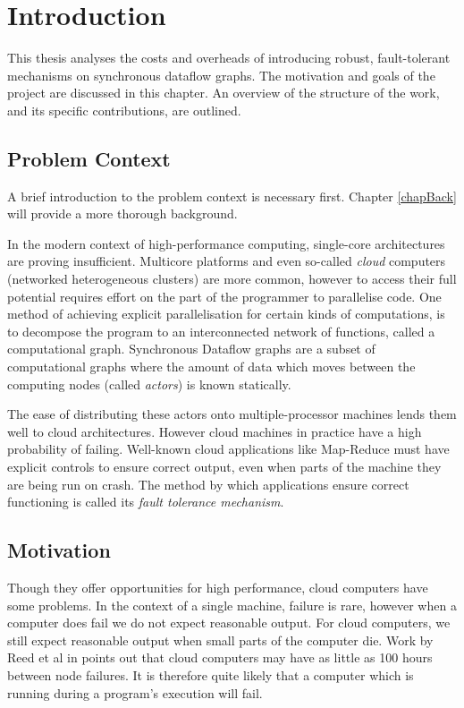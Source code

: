 \chapter{Introduction}

This thesis analyses the costs and overheads of introducing robust, fault-tolerant mechanisms on synchronous dataflow graphs.
The motivation and goals of the project are discussed in this chapter.
An overview of the structure of the work, and its specific contributions, are outlined.

\section{Problem Context}

A brief introduction to the problem context is necessary first.
Chapter \ref{chapBack} will provide a more thorough background.

In the modern context of high-performance computing, single-core architectures are proving insufficient.
Multicore platforms and even so-called {\em cloud} computers (networked heterogeneous clusters) are more common, however to access their full potential requires effort on the part of the programmer to parallelise code.
One method of achieving explicit parallelisation for certain kinds of computations, is to decompose the program to an interconnected network of functions, called a computational graph.
Synchronous Dataflow graphs are a subset of computational graphs where the amount of data which moves between the computing nodes (called {\em actors}) is known statically.

The ease of distributing these actors onto multiple-processor machines lends them well to cloud architectures.
However cloud machines in practice have a high probability of failing.
Well-known cloud applications like Map-Reduce must have explicit controls to ensure correct output, even when parts of the machine they are being run on crash.
The method by which applications ensure correct functioning is called its {\em fault tolerance mechanism}.

\section{Motivation}

Though they offer opportunities for high performance, cloud computers have some problems.
In the context of a single machine, failure is rare, however when a computer does fail we do not expect reasonable output.
For cloud computers, we still expect reasonable output when small parts of the computer die.
Work by Reed et al in \cite{ree06} points out that cloud computers may have as little as 100 hours between node failures.
It is therefore quite likely that a computer which is running during a program's execution will fail.


